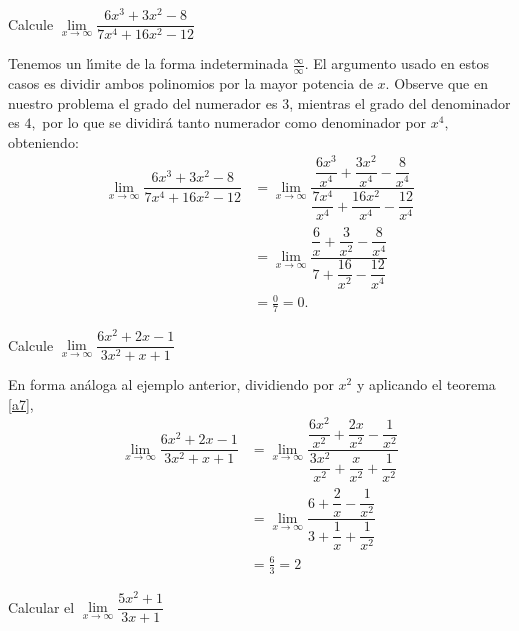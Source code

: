 \begin{example}
Calcule $\lim\limits_{x\rightarrow\infty}\dfrac{6x^{3}+3x^{2}-8}%
{7x^{4}+16x^{2}-12}$
\end{example}

\begin{sol}
Tenemos un l\'{\i}mite de la forma indeterminada $\frac{\infty}{\infty}$. El
argumento usado en estos casos es dividir ambos polinomios por la mayor
potencia de $x.$ Observe que en nuestro problema el grado del numerador es
$3$, mientras el grado del denominador es $4,$ por lo que se dividir\'{a}
tanto numerador como denominador por $x^{4},$ obteniendo:%
\begin{align*}
\lim\limits_{x\rightarrow\infty}\dfrac{6x^{3}+3x^{2}-8}{7x^{4}+16x^{2}-12}  &
=\lim\limits_{x\rightarrow\infty}\dfrac{\dfrac{6x^{3}}{x^{4}}+\dfrac{3x^{2}%
}{x^{4}}-\dfrac{8}{x^{4}}}{\dfrac{7x^{4}}{x^{4}}+\dfrac{16x^{2}}{x^{4}}%
-\dfrac{12}{x^{4}}}\\
&  =\lim\limits_{x\rightarrow\infty}\dfrac{\dfrac{6}{x}+\dfrac{3}{x^{2}%
}-\dfrac{8}{x^{4}}}{7+\dfrac{16}{x^{2}}-\dfrac{12}{x^{4}}}\\
&  =\frac{0}{7}=0.
\end{align*}

\end{sol}

\begin{example}
Calcule $\lim\limits_{x\rightarrow\infty}\dfrac{6x^{2}+2x-1}{3x^{2}+x+1}$
\end{example}

\begin{sol}
En forma an\'{a}loga al ejemplo anterior, dividiendo por $x^{2}$ y aplicando
el teorema \ref{a7},%
\begin{align*}
\lim\limits_{x\rightarrow\infty}\dfrac{6x^{2}+2x-1}{3x^{2}+x+1}  &
=\lim\limits_{x\rightarrow\infty}\dfrac{\dfrac{6x^{2}}{x^{2}}+\dfrac{2x}%
{x^{2}}-\dfrac{1}{x^{2}}}{\dfrac{3x^{2}}{x^{2}}+\dfrac{x}{x^{2}}+\dfrac
{1}{x^{2}}}\\
&  =\lim\limits_{x\rightarrow\infty}\dfrac{6+\dfrac{2}{x}-\dfrac{1}{x^{2}}%
}{3+\dfrac{1}{x}+\dfrac{1}{x^{2}}}\\
&  =\frac{6}{3}=2
\end{align*}

\end{sol}

\begin{example}
Calcular el $\lim\limits_{x\rightarrow\infty}\dfrac{5x^{2}+1}{3x+1}$
\end{example}

